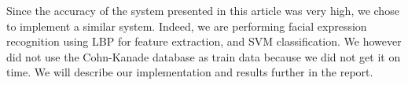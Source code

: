 \noindent Since the accuracy of the system presented in this article was very high, we chose to implement a similar system. Indeed, we are performing facial expression recognition using LBP for feature extraction, and SVM classification. We however did not use the Cohn-Kanade database as train data because we did not get it on time. We will describe our implementation and results further in the report. 
\newline

